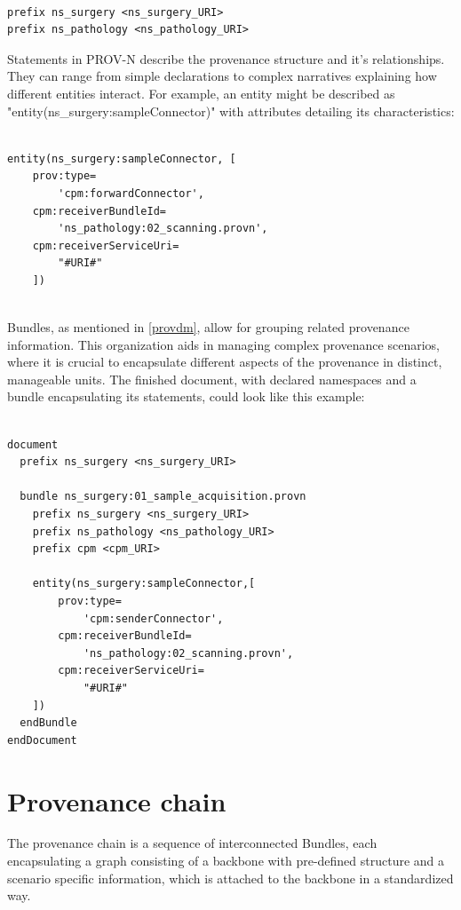 \documentclass[
  digital,     %
  oneside,     %
  nosansbold,  %
  nocolorbold, %
  lof,         %
  lot,         %
]{fithesis4}
\begin{document}
\begin{verbatim}

prefix ns_surgery <ns_surgery_URI>
prefix ns_pathology <ns_pathology_URI>

\end{verbatim}

Statements in PROV-N describe the provenance structure and it's relationships. They can range from simple declarations to complex narratives explaining how different entities interact. For example, an entity might be described as "entity(ns\_surgery:sampleConnector)" with attributes detailing its characteristics:

\begin{verbatim}

entity(ns_surgery:sampleConnector, [
    prov:type=
        'cpm:forwardConnector', 
    cpm:receiverBundleId=
        'ns_pathology:02_scanning.provn', 
    cpm:receiverServiceUri=
        "#URI#"
    ])
    
\end{verbatim}

Bundles, as mentioned in \ref{provdm}, allow for grouping related provenance information. This organization aids in managing complex provenance scenarios, where it is crucial to encapsulate different aspects of the provenance in distinct, manageable units. The finished document, with declared namespaces and a bundle encapsulating its statements, could look like this example:

\begin{verbatim}

document
  prefix ns_surgery <ns_surgery_URI>

  bundle ns_surgery:01_sample_acquisition.provn
    prefix ns_surgery <ns_surgery_URI>
    prefix ns_pathology <ns_pathology_URI>
    prefix cpm <cpm_URI>

    entity(ns_surgery:sampleConnector,[
        prov:type=
            'cpm:senderConnector',
        cpm:receiverBundleId=
            'ns_pathology:02_scanning.provn',
        cpm:receiverServiceUri=
            "#URI#"
    ])
  endBundle
endDocument

\end{verbatim}
\shorthandon{-}

\section{Provenance chain} \label{s-provchain}
\shorthandoff{-}
The provenance chain is a sequence of interconnected Bundles, each encapsulating a graph consisting of a backbone with pre-defined structure and a scenario specific information, which is attached to the backbone in a standardized way. 
\end{document}
